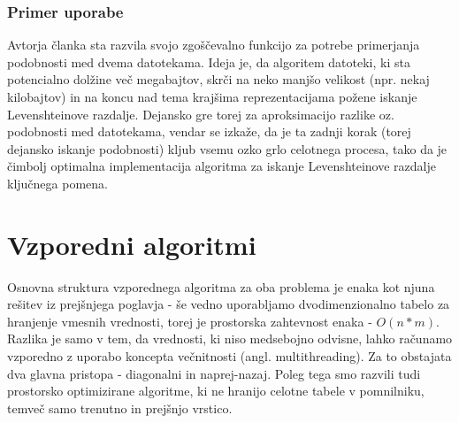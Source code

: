 \documentclass[a4paper,12pt,openright]{book}
\begin{document}
\subsection{Primer uporabe}

Avtorja članka \cite{documentsimilarity} sta razvila svojo zgoščevalno funkcijo za potrebe primerjanja podobnosti med dvema datotekama. Ideja je, da algoritem datoteki, ki sta potencialno dolžine več megabajtov, skrči na neko manjšo velikost (npr. nekaj kilobajtov) in na koncu nad tema krajšima reprezentacijama požene iskanje Levenshteinove razdalje. Dejansko gre torej za aproksimacijo razlike oz. podobnosti med datotekama, vendar se izkaže, da je ta zadnji korak (torej dejansko iskanje podobnosti) kljub vsemu ozko grlo celotnega procesa, tako da je čimbolj optimalna implementacija algoritma za iskanje Levenshteinove razdalje ključnega pomena. 


\chapter{Vzporedni algoritmi}

Osnovna struktura vzporednega algoritma za oba problema je enaka kot njuna rešitev iz prejšnjega poglavja - še vedno uporabljamo dvodimenzionalno tabelo za hranjenje vmesnih vrednosti, torej je prostorska zahtevnost enaka - \begin{math}O(n*m)\end{math}. Razlika je samo v tem, da vrednosti, ki niso medsebojno odvisne, lahko računamo vzporedno z uporabo koncepta večnitnosti (angl. multithreading). Za to obstajata dva glavna pristopa - diagonalni in naprej-nazaj. Poleg tega smo razvili tudi prostorsko optimizirane algoritme, ki ne hranijo celotne tabele v pomnilniku, temveč samo trenutno in prejšnjo vrstico. 
\end{document}
